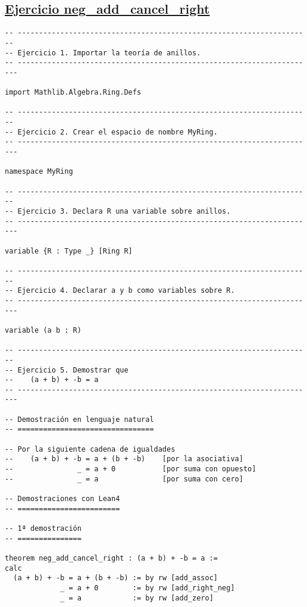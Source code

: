 \subsection{\href{./src/Basicos/neg\_add\_cancel\_right.lean}{Ejercicio neg\_add\_cancel\_right}}
\label{sec:org3745a1f}
\begin{verbatim}
-- ---------------------------------------------------------------------
-- Ejercicio 1. Importar la teoría de anillos.
-- ----------------------------------------------------------------------

import Mathlib.Algebra.Ring.Defs

-- ---------------------------------------------------------------------
-- Ejercicio 2. Crear el espacio de nombre MyRing.
-- ----------------------------------------------------------------------

namespace MyRing

-- ---------------------------------------------------------------------
-- Ejercicio 3. Declara R una variable sobre anillos.
-- ----------------------------------------------------------------------

variable {R : Type _} [Ring R]

-- ---------------------------------------------------------------------
-- Ejercicio 4. Declarar a y b como variables sobre R.
-- ----------------------------------------------------------------------

variable (a b : R)

-- ---------------------------------------------------------------------
-- Ejercicio 5. Demostrar que
--    (a + b) + -b = a
-- ----------------------------------------------------------------------

-- Demostración en lenguaje natural
-- ================================

-- Por la siguiente cadena de igualdades
--    (a + b) + -b = a + (b + -b)    [por la asociativa]
--               _ = a + 0           [por suma con opuesto]
--               _ = a               [por suma con cero]

-- Demostraciones con Lean4
-- ========================

-- 1ª demostración
-- ===============

theorem neg_add_cancel_right : (a + b) + -b = a :=
calc
  (a + b) + -b = a + (b + -b) := by rw [add_assoc]
             _ = a + 0        := by rw [add_right_neg]
             _ = a            := by rw [add_zero]


\end{verbatim}
